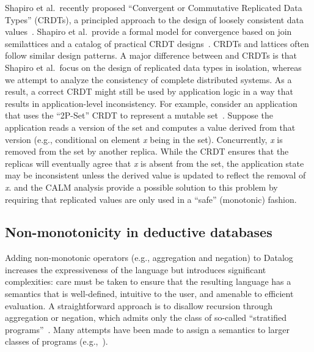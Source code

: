 Shapiro et al.\ recently proposed ``Convergent or Commutative Replicated Data
Types'' (CRDTs), a principled approach to the design of loosely consistent data
values~\cite{Shapiro2011b}. Shapiro et al.\ provide a formal model for
convergence based on join semilattices and a catalog of practical CRDT
designs~\cite{Shapiro2011a}. CRDTs and \lang lattices often follow similar
design patterns. A major difference between \lang and CRDTs is that Shapiro et
al.\ focus on the design of replicated data types in isolation, whereas we
attempt to analyze the consistency of complete distributed systems. As a result,
a correct CRDT might still be used by application logic in a way that results in
application-level inconsistency. For example, consider an application that uses
the ``2P-Set'' CRDT to represent a mutable set~\cite{Shapiro2011a}. Suppose the
application reads a version of the set and computes a value derived from that
version (e.g., conditional on element \emph{x} being in the set). Concurrently,
\emph{x} is removed from the set by another replica. While the CRDT ensures that
the replicas will eventually agree that \emph{x} is absent from the set, the
application state may be inconsistent unless the derived value is updated to
reflect the removal of \emph{x}. \lang and the CALM analysis provide a possible
solution to this problem by requiring that replicated values are only used in a
``safe'' (monotonic) fashion.





\subsection{Non-monotonicity in deductive databases}
Adding non-monotonic operators (e.g., aggregation and negation) to Datalog
increases the expressiveness of the language but introduces significant
complexities: care must be taken to ensure that the resulting language has a
semantics that is well-defined, intuitive to the user, and amenable to efficient
evaluation. A straightforward approach is to disallow recursion through
aggregation or negation, which admits only the class of so-called ``stratified
programs''~\cite{Apt1988}. Many attempts have been made to assign a semantics to
larger classes of programs (e.g.,~\cite{Gelfond1988,Ross1990,VanGelder1991}).

